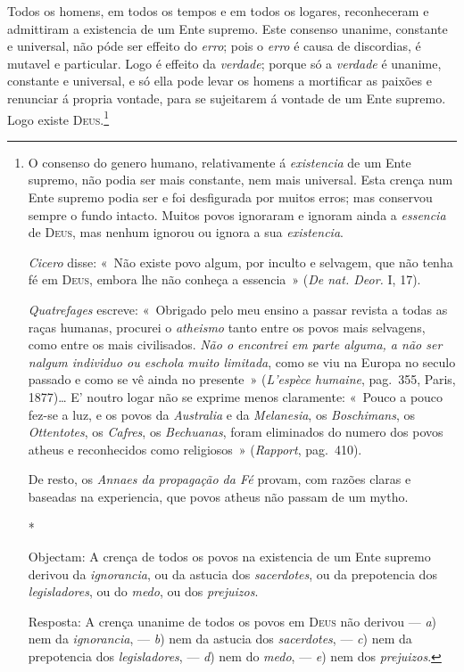  Todos os homens, em todos os tempos e em todos os logares, reconheceram e
admittiram a existencia de um Ente supremo. Este consenso unanime, constante e
universal, não póde ser effeito do \emph{erro}; pois o \emph{erro} é causa de
discordias, é mutavel e particular. Logo é effeito da \emph{verdade}; porque só a
\emph{verdade} é unanime, constante e universal, e só ella pode levar os homens a
mortificar as paixões e renunciar á propria vontade, para se sujeitarem á vontade de um
Ente supremo. Logo existe \textsc{Deus}.\footnote{O consenso do genero humano, relativamente á \emph{existencia} de um Ente supremo, não
podia ser mais constante, nem mais universal. Esta crença num Ente supremo podia ser e
foi desfigurada por muitos erros; mas conservou sempre o fundo intacto. Muitos povos
ignoraram e ignoram ainda a \emph{essencia} de \textsc{Deus}, mas nenhum ignorou ou
ignora a sua \emph{existencia}.

\emph{Cicero} disse: «~Não existe povo algum, por inculto e selvagem, que não tenha fé
em \textsc{Deus}, embora lhe não conheça a essencia~» (\emph{De nat. Deor.} I, 17).

\emph{Quatrefages} escreve: «~Obrigado pelo meu ensino a passar revista a todas as raças
humanas, procurei o \emph{atheismo} tanto entre os povos mais selvagens, como entre os
mais civilisados. \emph{Não o encontrei em parte alguma, a não ser nalgum individuo ou
eschola muito limitada}, como se viu na Europa no seculo passado e como se vê ainda no
presente~» (\emph{L'espèce humaine}, pag.~355, Paris, 1877)\dots{} E' noutro logar não
se exprime menos claramente: «~Pouco a pouco fez-se a luz, e os povos da
\emph{Australia} e da \emph{Melanesia}, os \emph{Boschimans}, os \emph{Ottentotes}, os
\emph{Cafres}, os \emph{Bechuanas}, foram eliminados do numero dos povos atheus e
reconhecidos como religiosos~» (\emph{Rapport}, pag.~410).

De resto, os \emph{Annaes da propagação da Fé} provam, com razões claras e baseadas na
experiencia, que povos atheus não passam de um mytho.

\begin{center}*\end{center}

Objectam: A crença de todos os povos na existencia de um Ente supremo derivou da
\emph{ignorancia}, ou da astucia dos \emph{sacerdotes}, ou da prepotencia dos
\emph{legisladores}, ou do \emph{medo}, ou dos \emph{prejuizos}.

Resposta: A crença unanime de todos os povos em \textsc{Deus} não derivou --- \emph{a})
nem da \emph{ignorancia}, --- \emph{b}) nem da astucia dos \emph{sacerdotes}, ---
\emph{c}) nem da prepotencia dos \emph{legisladores}, --- \emph{d}) nem do \emph{medo},
--- \emph{e}) nem dos \emph{prejuizos}.

}
